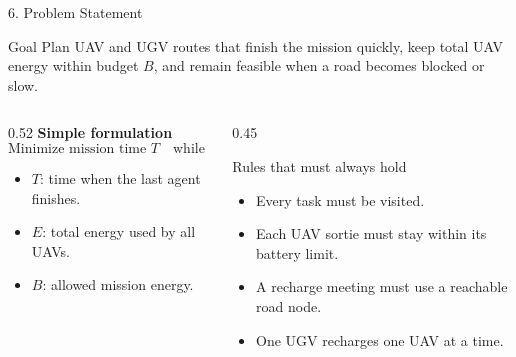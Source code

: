 \documentclass[aspectratio=169,10pt]{beamer}
\begin{document}
\begin{frame}{6. Problem Statement}
\small
\begin{block}{Goal}
Plan UAV and UGV routes that finish the mission quickly, keep total UAV energy within budget $B$,
and remain feasible when a road becomes blocked or slow.
\end{block}
\begin{columns}[T]
\begin{column}{0.52\textwidth}
\textbf{Simple formulation}
\[
\boxed{\text{Minimize mission time }T\quad\text{while}\quad E\le B}
\]
\begin{itemize}
  \item $T$: time when the last agent finishes.
  \item $E$: total energy used by all UAVs.
  \item $B$: allowed mission energy.
\end{itemize}
\end{column}
\begin{column}{0.45\textwidth}
\begin{alertblock}{Rules that must always hold}
\begin{itemize}
  \item Every task must be visited.
  \item Each UAV sortie must stay within its battery limit.
  \item A recharge meeting must use a reachable road node.
  \item One UGV recharges one UAV at a time.
\end{itemize}
\end{alertblock}
\end{column}
\end{columns}
\end{frame}
\end{document}
